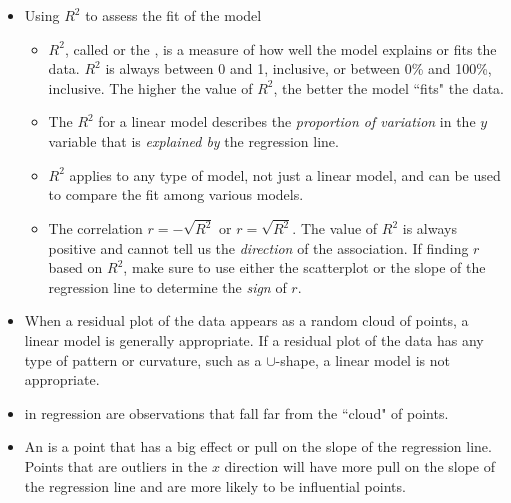 \begin{itemize}
\item Using $R^2$ to assess the fit of the model
\begin{itemize}
\item $R^2$, called  or the , is a measure of how well the model explains or fits the data. $R^2$ is always between 0 and 1, inclusive, or between 0\% and 100\%, inclusive.  The higher the value of $R^2$, the better the model ``fits" the data. 
\item The $R^2$ for a linear model describes the \emph{proportion of variation} in the $y$ variable that is \emph{explained by} the regression line.
\item $R^2$ applies to any type of model, not just a linear model, and can be used to compare the fit among various models.
\item The correlation $r = - \sqrt{R^2}$ or $r = \sqrt{R^2}$. The value of $R^2$ is always positive and cannot tell us the \emph{direction} of the association.  If finding $r$ based on $R^2$, make sure to use either the scatterplot or the slope of the regression line to determine the \emph{sign} of $r$.
\end{itemize}

\item When a residual plot of the data appears as a random cloud of points, a linear model is generally appropriate. If a residual plot of the data has any type of pattern or curvature, such as a $\cup$-shape, a linear model is not appropriate.

\item {} in regression are observations that fall far from the ``cloud" of points.

\item An  is a point that has a big effect or pull on the slope of the regression line.  Points that are outliers in the $x$ direction will have more pull on the slope of the regression line and are more likely to be influential points.

\end{itemize}




{}






